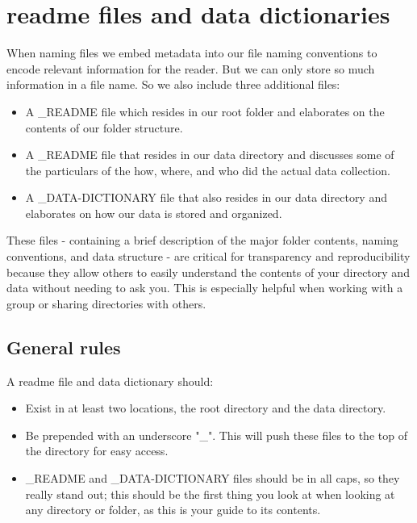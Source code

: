 \documentclass[
]{book}
\providecommand{\tightlist}{%
  \setlength{\itemsep}{0pt}\setlength{\parskip}{0pt}}
\begin{document}
\hypertarget{readme-files-and-data-dictionaries}{%
\section{readme files and data dictionaries}\label{readme-files-and-data-dictionaries}}

When naming files we embed metadata into our file naming conventions to encode relevant information for the reader. But we can only store so much information in a file name. So we also include three additional files:

\begin{itemize}
\tightlist
\item
  A \_README file which resides in our root folder and elaborates on the contents of our folder structure.
\item
  A \_README file that resides in our data directory and discusses some of the particulars of the how, where, and who did the actual data collection.
\item
  A \_DATA-DICTIONARY file that also resides in our data directory and elaborates on how our data is stored and organized.
\end{itemize}

These files - containing a brief description of the major folder contents, naming conventions, and data structure - are critical for transparency and reproducibility because they allow others to easily understand the contents of your directory and data without needing to ask you. This is especially helpful when working with a group or sharing directories with others.

\hypertarget{general-rules}{%
\subsection*{General rules}\label{general-rules}}

A readme file and data dictionary should:

\begin{itemize}
\tightlist
\item
  Exist in at least two locations, the root directory and the data directory.
\item
  Be prepended with an underscore "\_". This will push these files to the top of the directory for easy access.
\item
  \_README and \_DATA-DICTIONARY files should be in all caps, so they really stand out; this should be the first thing you look at when looking at any directory or folder, as this is your guide to its contents.
\end{itemize}
\end{document}
